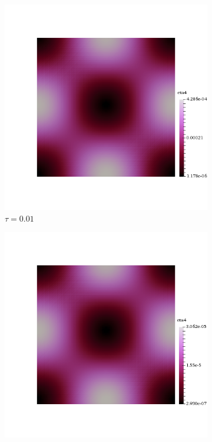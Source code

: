 \mbox{}\\ \\
\begin{figure}[h!]
  \centering
  \begin{subfigure}[b]{0.24\textwidth}
    \includegraphics[width=\textwidth,height=\textheight,keepaspectratio,height=\textheight,keepaspectratio]{figures/2_mpet/biomedical/time/eta4_dt1.png}
    \caption{$\tau=0.01$}
  \end{subfigure}
  \begin{subfigure}[b]{0.24\textwidth}
    \includegraphics[width=\textwidth,height=\textheight,keepaspectratio,height=\textheight,keepaspectratio]{figures/2_mpet/biomedical/time/eta4_dt2.png}

\end{subfigure}
\end{figure}
